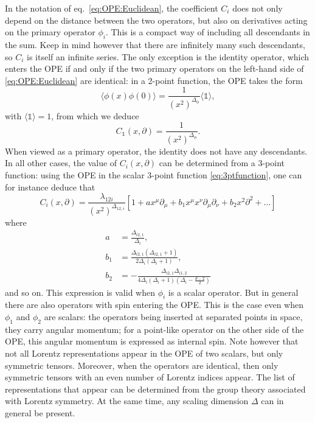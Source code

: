 \documentclass[a4paper,12pt]{article}
\numberwithin{equation}{section}
\begin{document}
In the notation of eq.~\eqref{eq:OPE:Euclidean}, the coefficient $C_i$ does not only depend on the distance between the two operators, but also on derivatives acting on the primary operator $\phi_i$. This is a compact way of including all descendants in the sum. Keep in mind however that there are infinitely many such descendants, so $C_i$ is itself an infinite series.
The only exception is the identity operator, which enters the OPE if and only if the two primary operators on the left-hand side of \eqref{eq:OPE:Euclidean} are identical: in a 2-point function, the OPE takes the form
\begin{equation}
	\langle \phi(x) \phi(0) \rangle = 
	\frac{1}{(x^2)^{\Delta_\phi}} \langle \mathds{1} \rangle,
\end{equation}
with $\langle \mathds{1} \rangle = 1$,
from which we deduce 
\begin{equation}
	C_\mathds{1}(x, \partial) = \frac{1}{(x^2)^{\Delta_\phi}}.
\end{equation}
When viewed as a primary operator, the identity does not have any descendants.
In all other cases, the value of $C_i(x, \partial)$ can be determined from a 3-point function: using the OPE in the scalar 3-point function \eqref{eq:3ptfunction}, one can for instance deduce that
\begin{equation}
	C_i(x, \partial)
	= \frac{\lambda_{12i}}{(x^2)^{\Delta_{12,i}}}
	\left[ 1 + a x^\mu \partial_\mu
	+ b_1 x^\mu x^\nu \partial_\mu \partial_\nu
	+ b_2 x^2 \partial^2 + \ldots \right]
\end{equation}
where
\begin{align}
	a &= \frac{\Delta_{i2,1}}{\Delta_i},
	\nonumber \\
	b_1 &= \frac{\Delta_{i2,1} (\Delta_{i2,1} + 1)}
	{2\Delta_i (\Delta_i + 1)},
	\\
	b_2 &= - \frac{\Delta_{i2,1} \Delta_{i1,2}}
	{4 \Delta_i (\Delta_i + 1) \left( \Delta_i - \frac{d-2}{2} \right)}
	\nonumber 
\end{align}
and so on. This expression is valid when $\phi_i$ is a scalar operator.
But in general there are also operators with spin entering the OPE. This is the case even when $\phi_1$ and $\phi_2$ are scalars: the operators being inserted at separated points in space, they carry angular momentum; for a point-like operator on the other side of the OPE, this angular momentum is expressed as internal spin.
Note however that not all Lorentz representations appear in the OPE of two scalars, but only symmetric tensors. Moreover, when the operators are identical, then only symmetric tensors with an even number of Lorentz indices appear. The list of representations that appear can be determined from the group theory associated with Lorentz symmetry. At the same time, any scaling dimension $\Delta$ can in general be present.
\end{document}
